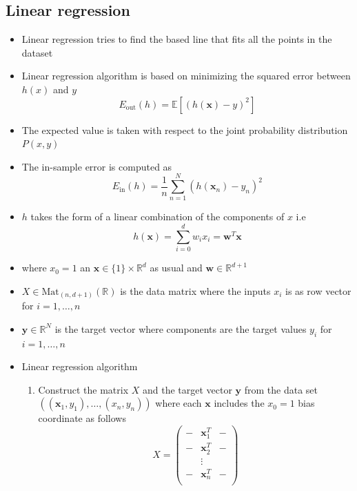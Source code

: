 \documentclass[a4, english]{article}
\begin{document}
\subsection{Linear regression}
\begin{itemize}
  \item Linear regression tries to find the based line that fits all the points in the dataset
	\item Linear regression algorithm is based on minimizing the squared error between $h(x)$ and $y$ 
\begin{equation*}
  E_\text{out}(h) = \mathbb E[(h(\pmb x) - y)^2]
\end{equation*}
  \item The expected value is taken with respect to the joint probability distribution $P(x,y)$ 
  \item The in-sample error is computed as 
\begin{equation*}
  E_\text{in}(h) = \frac{1}{n}\sum_{n=1}^N(h(\pmb x_n) - y_n)^2
\end{equation*}
  \item $h$ takes the form of a linear combination of the components of $x$ i.e 
\begin{equation*}
  h(\pmb x) = \sum_{i=0}^dw_ix_i = \pmb w^T\pmb x
\end{equation*}
  \item	where $x_0 = 1$ an $\pmb x \in \{1\} \times \mathbb R ^d$ as usual and $\pmb w \in \mathbb R^{d+1}$ 
  \item $X \in \text{Mat}_{(n, d+1)}(\mathbb R)$ is the data matrix where the inputs $x_i$ is as row vector for $i=1,\dots, n$
  \item $\pmb y \in \mathbb R^N$ is the target vector where components are the target values $y_i$ for $i=1,\dots, n$ 
  \item Linear regression algorithm
  \begin{enumerate}
  	\item Construct the matrix $X$ and the target vector $\pmb y$ from the data set $((\pmb x_1, y_1), \dots, (x_n,y_n))$ where each $\pmb x$ includes the $x_0=1$ bias coordinate as follows
\begin{equation*}
  X = 
  \begin{pmatrix} 
    - & \pmb x_1^T & - \\
    - & \pmb x_2^T & - \\
      & \vdots & \\
    - & \pmb x_n^T & - \\
  \end{pmatrix}

\end{equation*}
\end{enumerate}
\end{itemize}
\end{document}
